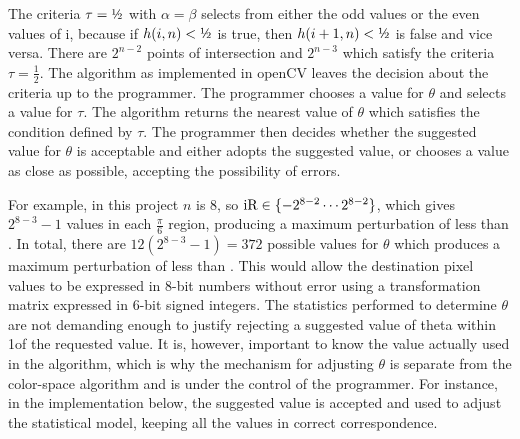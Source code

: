 The criteria $\tau =\text{\textonehalf}$ with $\alpha=\beta$ selects from either the odd values or the even values of i, because if $h(i,n)<\text{\textonehalf}$ is true, then $h(i+1,n)<\text{\textonehalf}$  is false and vice versa. There are $2^{n-2}$ points of intersection and $2^{n-3}$ which satisfy the criteria $\tau = \frac{1}{2}$. The algorithm as implemented in openCV leaves the decision about the criteria up to the programmer. The programmer chooses a value for $\theta$ and selects a value for $\tau$. The algorithm returns the nearest value of $\theta$ which satisfies the condition defined by $\tau$. The programmer then decides whether the suggested value for $\theta$ is acceptable and either adopts the suggested value, or chooses a value as close as possible, accepting the possibility of errors.

For example, in this project $n$ is 8, so $\text{iR} \in \{ -2^{8-2} \cdots 2^{8-2} \}$, which gives $2^{8-3}-1$ values in each $\frac{\pi}{6}$ region, producing a maximum perturbation of less than \textonehalf. In total, there are $12 (2^{8-3}-1) = 372$ possible values for $\theta$ which produces a maximum perturbation of less than \textonehalf. This would allow the destination pixel values to be expressed in 8-bit numbers without error using a transformation matrix expressed in 6-bit signed integers. The statistics performed to determine $\theta$ are not demanding enough to justify rejecting a suggested value of theta within 1\textdegree  of the requested value. It is, however, important to know the value actually used in the algorithm, which is why the mechanism for adjusting $\theta$ is separate from the color-space algorithm and is under the control of the programmer. For instance, in the implementation below, the suggested value is accepted and used to adjust the statistical model, keeping all the values in correct correspondence.

